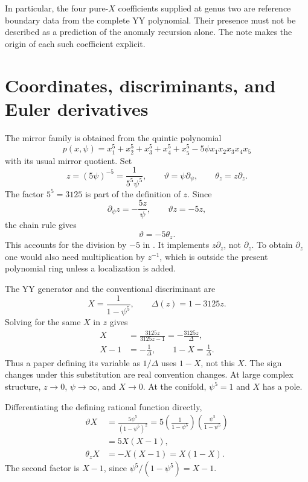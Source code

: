 \documentclass[11pt,a4paper]{article}
\numberwithin{equation}{section}
\newcommand{\tht}{\vartheta}
\newcommand{\del}{\partial}
\newcommand{\code}[1]{\texttt{\detokenize{#1}}}
\begin{document}
In particular, the four pure-$X$ coefficients supplied at genus two are
reference boundary data from the complete YY polynomial. Their presence
must not be described as a prediction of the anomaly recursion alone.
The note makes the origin of each such coefficient explicit.

\section{Coordinates, discriminants, and Euler derivatives}
\label{sec:coordinate}

The mirror family is obtained from the quintic polynomial
\begin{equation}
p(x,\psi)=x_1^5+x_2^5+x_3^5+x_4^5+x_5^5
          -5\psi x_1x_2x_3x_4x_5
\end{equation}
with its usual mirror quotient. Set
\begin{equation}
z=(5\psi)^{-5}=\frac{1}{5^5\psi^5},\qquad
\tht=\psi\del_\psi,\qquad \theta_z=z\del_z.
\end{equation}
The factor $5^5=3125$ is part of the definition of $z$.
Since
\begin{equation}
\del_\psi z=-\frac{5z}{\psi},\qquad
\tht z=-5z,
\end{equation}
the chain rule gives
\begin{equation}\boxed{\tht=-5\theta_z.}\label{eq:theta-coordinate}\end{equation}
This accounts for the division by $-5$ in \code{YYRing.theta_z}.
It implements $z\del_z$, not $\del_z$. To obtain $\del_z$ one would
also need multiplication by $z^{-1}$, which is outside the present polynomial
ring unless a localization is added.

The YY generator and the conventional discriminant are
\begin{equation}
X=\frac{1}{1-\psi^5},\qquad \Delta(z)=1-3125z.
\end{equation}
Solving for the same $X$ in $z$ gives
\begin{align}
X&=\frac{3125z}{3125z-1}=-\frac{3125z}{\Delta},\\
X-1&=-\frac1{\Delta},\qquad 1-X=\frac1{\Delta}.
\end{align}
Thus a paper defining its variable as $1/\Delta$ uses $1-X$, not this $X$.
The sign changes under this substitution are real convention changes.
At large complex structure, $z\to0$, $\psi\to\infty$, and $X\to0$.
At the conifold, $\psi^5=1$ and $X$ has a pole.

Differentiating the defining rational function directly,
\begin{align}
\tht X&=\frac{5\psi^5}{(1-\psi^5)^2}
       =5\left(\frac1{1-\psi^5}\right)
           \left(\frac{\psi^5}{1-\psi^5}\right)\\
       &=5X(X-1),\label{eq:thetaX}\\
\theta_z X&=-X(X-1)=X(1-X).
\end{align}
The second factor is $X-1$, since $\psi^5/(1-\psi^5)=X-1$.
\end{document}
